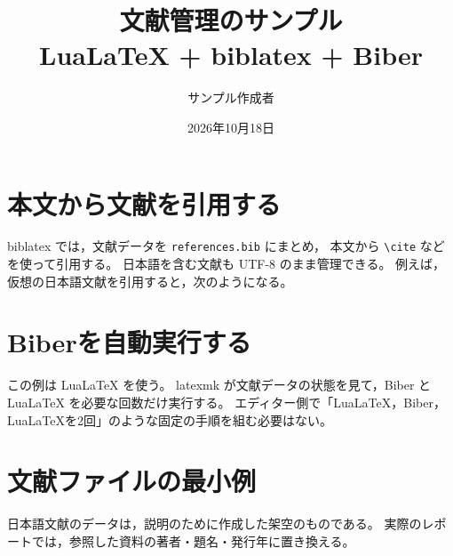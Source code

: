 \documentclass[a4paper,11pt]{ltjsarticle}
\title{文献管理のサンプル\\[0.4em]\large LuaLaTeX + biblatex + Biber}
\author{サンプル作成者}
\date{2026年10月18日}
\begin{document}
\maketitle
\section{本文から文献を引用する}
biblatex では，文献データを \texttt{references.bib} にまとめ，
本文から \verb|\cite| などを使って引用する\cite{biblatex}。
日本語を含む文献も UTF-8 のまま管理できる。
例えば，仮想の日本語文献を引用すると，次のようになる\cite{sample-japanese}。

\section{Biberを自動実行する}
この例は LuaLaTeX を使う。
latexmk が文献データの状態を見て，Biber と LuaLaTeX を必要な回数だけ実行する。
エディター側で「LuaLaTeX，Biber，LuaLaTeXを2回」のような固定の手順を組む必要はない。

\section{文献ファイルの最小例}
日本語文献のデータは，説明のために作成した架空のものである。
実際のレポートでは，参照した資料の著者・題名・発行年に置き換える。

\printbibliography[title={参考文献}]
\end{document}
